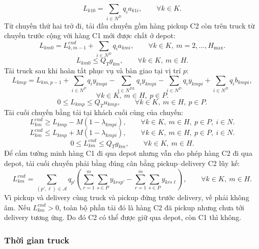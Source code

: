 \documentclass[12pt,a4paper]{article}
\begin{document}
\begin{equation}
  L_{k10}=\sum_{i\in N^D}q_i a_{k1i}, \qquad \forall k\in K.
\end{equation}
Từ chuyến thứ hai trở đi, tải đầu chuyến gồm hàng pickup C2 còn trên truck từ chuyến
trước cộng với hàng C1 mới được chất ở depot:
\begin{equation}
  L_{km0}=L^{end}_{k,m-1}+\sum_{i\in N^D}q_i a_{kmi}, \qquad \forall k\in K,\ m=2,\ldots,H_{\max}.
\end{equation}
\begin{equation}
  L_{km0}\le Q_Tg_{km}, \qquad \forall k\in K,\ m\in H.
\end{equation}
Tải truck sau khi hoàn tất phục vụ và bàn giao tại vị trí $p$:
\begin{equation}
  L_{kmp} = L_{km,p-1} +\sum_{i\in N^P}q_i y_{kmpi} -\sum_{i\in N^{DL}}q_i y_{kmpi} -\sum_{i\in N^D}q_i y_{kmpi} +\sum_{i\in N^D}q_i b_{kmpi},
\end{equation}
\[
  \forall k\in K,\ m\in H,\ p\in P.
\]
\begin{equation}
  0\le L_{kmp}\le Q_Tu_{kmp}, \qquad \forall k\in K,\ m\in H,\ p\in P.
\end{equation}
Tải cuối chuyến bằng tải tại khách cuối cùng của chuyến:
\begin{equation}
  L^{end}_{km}\ge L_{kmp}-M(1-\lambda_{kmpi}), \qquad \forall k\in K,\ m\in H,\ p\in P,\ i\in N.
\end{equation}
\begin{equation}
  L^{end}_{km}\le L_{kmp}+M(1-\lambda_{kmpi}), \qquad \forall k\in K,\ m\in H,\ p\in P,\ i\in N.
\end{equation}
\begin{equation}
  0\le L^{end}_{km}\le Q_Tg_{km}, \qquad \forall k\in K,\ m\in H.
\end{equation}
Để cấm tường minh hàng C1 đi qua depot nhưng vẫn cho phép hàng C2 đi qua depot, tải
cuối chuyến phải bằng đúng cân bằng pickup--delivery C2 lũy kế:
\begin{equation}
  L^{end}_{km} = \sum_{(p',\ell)\in\mathcal A}q_{p'}\left(\sum_{r=1}^{m}\sum_{s\in P}y_{krs p'} - \sum_{r=1}^{m}\sum_{s\in P}y_{krs\ell}\right), \qquad \forall k\in K,\ m\in H.
\end{equation}
Vì pickup và delivery cùng truck và pickup đứng trước delivery, vế phải không âm.
Nếu $L^{end}_{km}>0$, toàn bộ phần tải đó là hàng C2 đã pickup nhưng chưa tới
delivery tương ứng. Do đó C2 có thể được giữ qua depot, còn C1 thì không.

\subsubsection{Thời gian truck}
\end{document}
